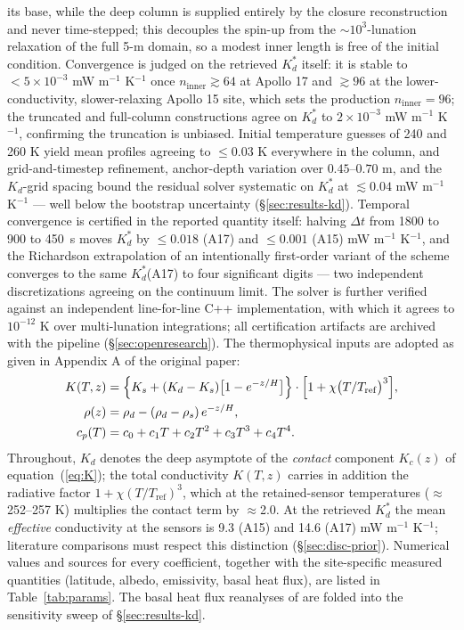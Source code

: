 \documentclass[11pt]{article}
\begin{document}
its base, while the deep column is supplied entirely by the closure
reconstruction and never time-stepped; this decouples the spin-up from
the $\sim$$10^3$-lunation relaxation of the full 5-m domain, so a modest
inner length is free of the initial condition. Convergence is judged on
the retrieved $K_d^{*}$ itself: it is stable to
$<\!5\times10^{-3}$ mW m$^{-1}$ K$^{-1}$ once $n_\mathrm{inner}\gtrsim 64$
at Apollo 17 and $\gtrsim 96$ at the lower-conductivity, slower-relaxing
Apollo 15 site, which sets the production $n_\mathrm{inner}=96$; the
truncated and full-column constructions agree on $K_d^{*}$ to
$2\times10^{-3}$ mW m$^{-1}$ K$^{-1}$, confirming the truncation is
unbiased. Initial temperature guesses of 240 and 260 K yield mean
profiles agreeing to $\le 0.03$ K everywhere in the column, and
grid-and-timestep refinement, anchor-depth variation over
$0.45$--$0.70$ m, and the $K_d$-grid spacing bound the residual solver
systematic on $K_d^{*}$ at $\lesssim 0.04$ mW m$^{-1}$ K$^{-1}$ --- well
below the bootstrap uncertainty (\S\ref{sec:results-kd}).
Temporal convergence is certified in the reported quantity itself:
halving $\Delta t$ from 1800 to 900 to \SI{450}{\second} moves
$K_d^{*}$ by $\le 0.018$ (A17) and $\le 0.001$ (A15)
mW m$^{-1}$ K$^{-1}$, and the Richardson extrapolation of an
intentionally first-order variant of the scheme converges to the same
$K_d^{*}$(A17) to four significant digits --- two independent
discretizations agreeing on the continuum limit. The solver is further
verified against an independent line-for-line C++ implementation, with
which it agrees to $10^{-12}$ K over multi-lunation integrations; all
certification artifacts are archived with the pipeline
(\S\ref{sec:openresearch}). The
\citet{hayne2017} thermophysical inputs are adopted as given in Appendix A
of the original paper:
\begin{align}
K(T,z) &= \Bigl\{K_s + (K_d-K_s)\bigl[1-e^{-z/H}\bigr]\Bigr\}
         \cdot\Bigl[1 + \chi\bigl(T/T_\mathrm{ref}\bigr)^3\Bigr], \label{eq:K} \\
\rho(z) &= \rho_d - (\rho_d-\rho_s)\,e^{-z/H}, \label{eq:rho}\\
c_p(T)  &= c_0 + c_1 T + c_2 T^2 + c_3 T^3 + c_4 T^4. \label{eq:cp}
\end{align}
Throughout, $K_d$ denotes the deep asymptote of the \emph{contact}
component $K_c(z)$ of equation~(\ref{eq:K}); the total conductivity
$K(T,z)$ carries in addition the radiative factor
$1+\chi(T/T_\mathrm{ref})^3$, which at the retained-sensor temperatures
($\approx$252--257 K) multiplies the contact term by $\approx$2.0. At the
retrieved $K_d^{*}$ the mean \emph{effective} conductivity at the sensors
is 9.3 (A15) and 14.6 (A17) mW m$^{-1}$ K$^{-1}$; literature comparisons
must respect this distinction (\S\ref{sec:disc-prior}).
Numerical values and sources for every coefficient, together with the
site-specific measured quantities (latitude, albedo, emissivity, basal heat
flux), are listed in Table~\ref{tab:params}. The basal heat flux
reanalyses of \citet{saito2007,nagihara2018} are folded into the
sensitivity sweep of \S\ref{sec:results-kd}.
\end{document}
